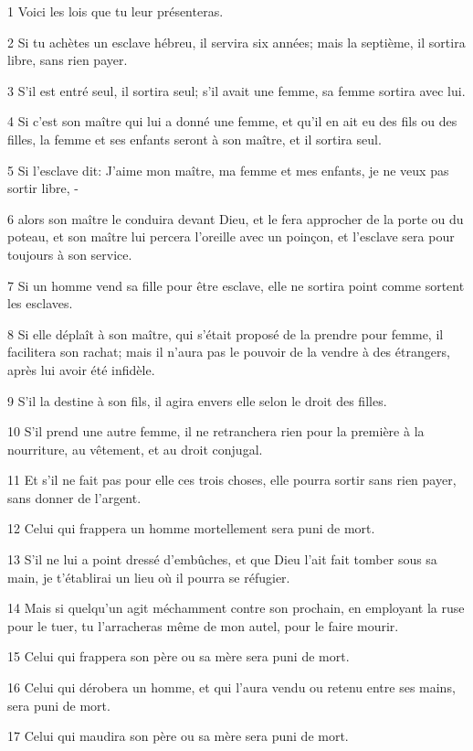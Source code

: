 \par 1 Voici les lois que tu leur présenteras.
\par 2 Si tu achètes un esclave hébreu, il servira six années; mais la septième, il sortira libre, sans rien payer.
\par 3 S'il est entré seul, il sortira seul; s'il avait une femme, sa femme sortira avec lui.
\par 4 Si c'est son maître qui lui a donné une femme, et qu'il en ait eu des fils ou des filles, la femme et ses enfants seront à son maître, et il sortira seul.
\par 5 Si l'esclave dit: J'aime mon maître, ma femme et mes enfants, je ne veux pas sortir libre, -
\par 6 alors son maître le conduira devant Dieu, et le fera approcher de la porte ou du poteau, et son maître lui percera l'oreille avec un poinçon, et l'esclave sera pour toujours à son service.
\par 7 Si un homme vend sa fille pour être esclave, elle ne sortira point comme sortent les esclaves.
\par 8 Si elle déplaît à son maître, qui s'était proposé de la prendre pour femme, il facilitera son rachat; mais il n'aura pas le pouvoir de la vendre à des étrangers, après lui avoir été infidèle.
\par 9 S'il la destine à son fils, il agira envers elle selon le droit des filles.
\par 10 S'il prend une autre femme, il ne retranchera rien pour la première à la nourriture, au vêtement, et au droit conjugal.
\par 11 Et s'il ne fait pas pour elle ces trois choses, elle pourra sortir sans rien payer, sans donner de l'argent.
\par 12 Celui qui frappera un homme mortellement sera puni de mort.
\par 13 S'il ne lui a point dressé d'embûches, et que Dieu l'ait fait tomber sous sa main, je t'établirai un lieu où il pourra se réfugier.
\par 14 Mais si quelqu'un agit méchamment contre son prochain, en employant la ruse pour le tuer, tu l'arracheras même de mon autel, pour le faire mourir.
\par 15 Celui qui frappera son père ou sa mère sera puni de mort.
\par 16 Celui qui dérobera un homme, et qui l'aura vendu ou retenu entre ses mains, sera puni de mort.
\par 17 Celui qui maudira son père ou sa mère sera puni de mort.
